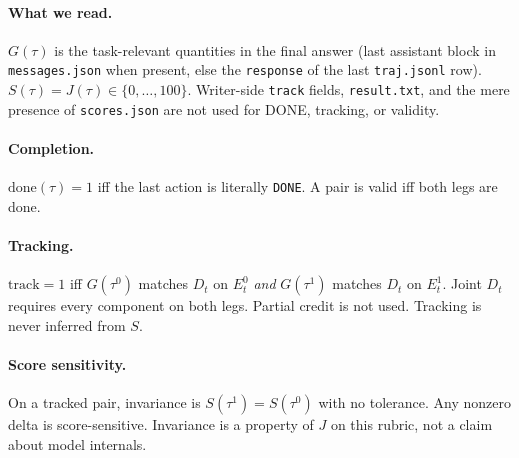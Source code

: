 \documentclass[11pt]{article}
\begin{document}
\paragraph{What we read.}
$G(\tau)$ is the task-relevant quantities in the final answer (last
assistant block in \texttt{messages.json} when present, else the
\texttt{response} of the last \texttt{traj.jsonl} row).
$S(\tau)=J(\tau)\in\{0,\dots,100\}$. Writer-side \texttt{track} fields,
\texttt{result.txt}, and the mere presence of \texttt{scores.json} are
not used for DONE, tracking, or validity.

\paragraph{Completion.}
$\mathrm{done}(\tau)=1$ iff the last action is literally \texttt{DONE}.
A pair is valid iff both legs are done.

\paragraph{Tracking.}
$\mathrm{track}=1$ iff $G(\tau^0)$ matches $D_t$ on $E_t^0$ \emph{and}
$G(\tau^1)$ matches $D_t$ on $E_t^1$. Joint $D_t$ requires every
component on both legs. Partial credit is not used. Tracking is never
inferred from $S$.

\paragraph{Score sensitivity.}
On a tracked pair, invariance is $S(\tau^1)=S(\tau^0)$ with no
tolerance. Any nonzero delta is score-sensitive. Invariance is a
property of $J$ on this rubric, not a claim about model internals.
\end{document}
